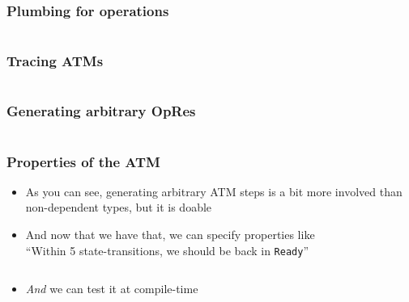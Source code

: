 \documentclass[compress,handout]{beamer}
\begin{document}
\begin{frame}[fragile]
  \frametitle{Plumbing for operations}

  \inputminted{Idris}{qc-things/ATM-opres.idr}

\end{frame}


\begin{frame}[fragile]
  \frametitle{Tracing ATMs}

  \inputminted[fontsize=\footnotesize]{Idris}{qc-things/ATM-tracing.idr}

\end{frame}


\begin{frame}[fragile]
  \frametitle{Generating arbitrary OpRes}

  \inputminted[fontsize=\scriptsize]{Idris}{qc-things/ATM-arb-opres.idr}

\end{frame}


\begin{frame}
  \frametitle{Properties of the ATM}

  \begin{itemize}
    \item<1-> As you can see, generating arbitrary ATM steps is a bit more
              involved than non-dependent types, but it is doable
    \item<2-> And now that we have that, we can specify properties like\\
              ``Within 5 state-transitions, we should be back in
              \texttt{Ready}''
              \vspace*{-1mm}
              \inputminted{Idris}{qc-things/ATM-props.idr}
    \item<3-> \textit{And} we can test it at compile-time
              \vspace*{-1mm}
              \inputminted{Idris}{qc-things/ATM-qc-props.idr}
              \vspace*{-3mm}
  \end{itemize}

\end{frame}
\end{document}
